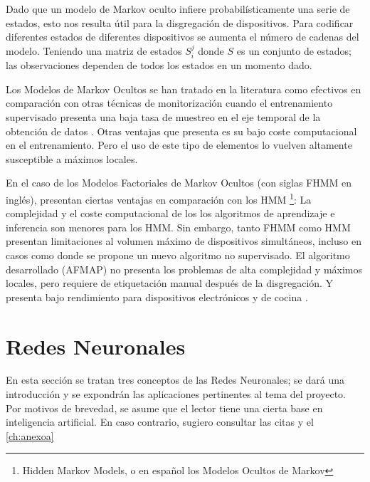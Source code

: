Dado que un modelo de Markov oculto infiere probabilísticamente una serie de estados, esto nos resulta útil para la disgregación de dispositivos. Para codificar diferentes estados de diferentes dispositivos se aumenta el número de cadenas del modelo. Teniendo una matriz de estados $S_i^j$ donde $S$ es un conjunto de estados; las observaciones dependen de todos los estados en un momento dado.

Los Modelos de Markov Ocultos se han tratado en la literatura como efectivos en comparación con otras técnicas de monitorización cuando el entrenamiento supervisado presenta una baja tasa de muestreo en el eje temporal de la obtención de datos \autocite{frenchHMMNILM}.
Otras ventajas que presenta es su bajo coste computacional en el entrenamiento. Pero el uso de este tipo de elementos lo vuelven altamente susceptible a máximos locales\autocite{NILMreview2017}.

En el caso de los Modelos Factoriales de Markov Ocultos (con siglas FHMM en inglés), presentan ciertas ventajas en comparación con los HMM \footnote{Hidden Markov Models, o en español los Modelos Ocultos de Markov}:
La complejidad y el coste computacional de los los algoritmos de aprendizaje e inferencia son menores para los HMM. Sin embargo, tanto FHMM como HMM presentan limitaciones al volumen máximo de dispositivos simultáneos, incluso en casos como \autocite{afmap2012} donde se propone un nuevo algoritmo no supervisado. El algoritmo desarrollado (AFMAP) no presenta los problemas de alta complejidad y máximos locales, pero requiere de etiquetación manual después de la disgregación. Y presenta bajo rendimiento para dispositivos electrónicos y de cocina \autocite[5]{NILMreview2017}.

\section{Redes Neuronales}

En esta sección se tratan tres conceptos de las Redes Neuronales; se dará una introducción y se expondrán las aplicaciones pertinentes al tema del proyecto.
Por motivos de brevedad, se asume que el lector tiene una cierta base en inteligencia artificial. En caso contrario, sugiero consultar las citas y el \autoref{ch:anexoa}
